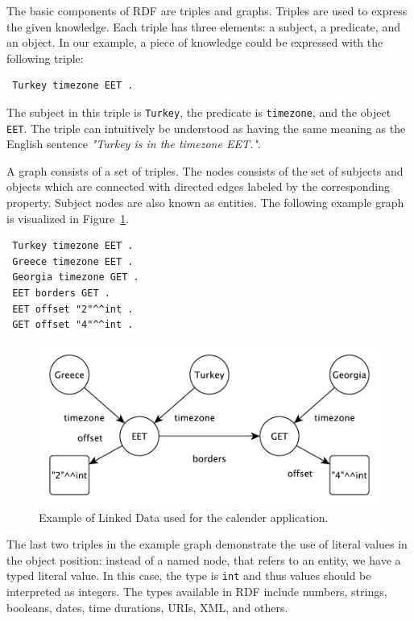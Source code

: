 The basic components of \ac{RDF} are triples and graphs.
Triples are used to express the given knowledge.
Each triple has three elements: a subject, a predicate, and an object.
In our example, a piece of knowledge could be expressed with the following triple:

\begin{verbatim}
 Turkey timezone EET .
\end{verbatim}

The subject in this triple is \texttt{Turkey}, the predicate is \texttt{timezone}, and the object \texttt{EET}.
The triple can intuitively be understood as having the same meaning as the English sentence \textit{"Turkey is in the timezone EET."}.

A graph consists of a set of triples.
The nodes consists of the set of subjects and objects which are connected with directed edges labeled by the corresponding property.
Subject nodes are also known as entities.
The following example graph is visualized in Figure~\ref{fig:graph}.
\begin{verbatim}
 Turkey timezone EET .
 Greece timezone EET .
 Georgia timezone GET .
 EET borders GET .
 EET offset "2"^^int .
 GET offset "4"^^int . 
\end{verbatim}

\begin{figure}
\includegraphics[width=\linewidth]{part_01/fig_graph.pdf}
\caption{Example of Linked Data used for the calender application.}
\label{fig:graph}
\end{figure}

The last two triples in the example graph demonstrate the use of literal values in the object position: instead of a named node, that refers to an entity, we have a typed literal value.
In this case, the type is \texttt{int} and thus values should be interpreted as integers.
The types available in \ac{RDF} include numbers, strings, booleans, dates, time durations, URIs, XML, and others.

